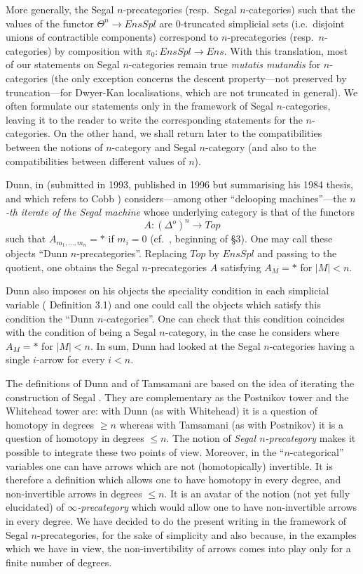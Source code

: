 More generally, the Segal $n$-precategories
(resp.\ Segal $n$-categories)
such that the values of the functor $\Theta ^n \rightarrow EnsSpl$
are $0$-truncated simplicial sets (i.e.\ disjoint unions of
contractible components) correspond to $n$-precategories
(resp.\ $n$-categories) by composition with $\pi _0: EnsSpl
\rightarrow Ens$. With this translation, most of our statements on
Segal $n$-categories remain true {\em mutatis mutandis} for
$n$-categories (the only exception concerns the descent
property---not preserved by truncation---for Dwyer-Kan localisations,
which are not truncated in general). We often formulate
our
statements only in the framework of Segal $n$-categories, leaving it to the
reader to write the corresponding statements for the
$n$-categories.
On the other hand, we shall return later to the compatibilities between the
notions of
$n$-category and Segal $n$-category (and also to the compatibilities
between different values of $n$).

Dunn, in \cite{Dunn} (submitted in 1993, published in 1996 but summarising his
1984 thesis, and which refers to Cobb \cite{Cobb})
considers---among other ``delooping machines''---the {\em $n$-th
iterate of the Segal machine} whose underlying category is that of the
functors
$$
A: (\Delta ^o) ^n\rightarrow Top
$$
such that $A_{m_1,\ldots , m_n}=\ast$ if $m_i=0$ (cf.\ \cite{Dunn}, beginning of
\S 3). One may call these objects ``Dunn $n$-precategories''.
Replacing $Top$ by $EnsSpl$ and passing to the quotient, one obtains
the Segal $n$-precategories $A$ satisfying $A_M=\ast$ for
$|M|<n$.

Dunn also imposes on his objects the speciality condition in each simplicial
variable
(\cite{Dunn} Definition 3.1) and one could call the objects which satisfy
this condition the ``Dunn $n$-categories''. One can check that
this
condition coincides with the condition of being a Segal $n$-category, in
the case he considers where $A_M= \ast$ for $|M|< n$.
In sum, Dunn had looked at the Segal $n$-categories having a
single $i$-arrow for every $i< n$.

The definitions of Dunn and of Tamsamani
are based on the idea of iterating the construction of Segal
\cite{Segal}. They are complementary as the
Postnikov tower and the Whitehead tower are: with Dunn (as with Whitehead)
it is a question of homotopy in degrees $\geq n$ whereas with Tamsamani (as
with Postnikov)
it is a question of homotopy in degrees $\leq n$. The notion of {\em Segal
$n$-precategory} makes it possible to integrate these two points of view.
Moreover, in the ``$n$-categorical'' variables one can have arrows which are
not (homotopically) invertible. It is therefore a definition which allows one
to have homotopy in every degree, and non-invertible arrows in degrees $\leq
n$. It is an avatar of the notion (not yet fully elucidated) of {\em
$\infty$-precategory} which
would allow one to have non-invertible arrows in every degree. We have
decided to do the present writing in the framework of Segal $n$-precategories,
for the sake of simplicity and also because, in the examples which we have in
view,
the non-invertibility of arrows comes into play only for a finite number
of degrees.


